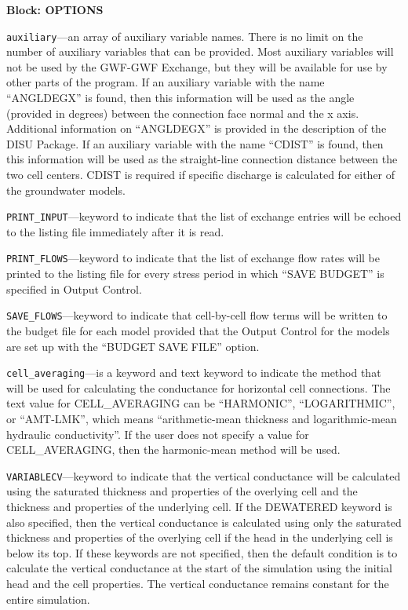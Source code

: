 
\item \textbf{Block: OPTIONS}

\begin{description}
\item \texttt{auxiliary}---an array of auxiliary variable names.  There is no limit on the number of auxiliary variables that can be provided. Most auxiliary variables will not be used by the GWF-GWF Exchange, but they will be available for use by other parts of the program.  If an auxiliary variable with the name ``ANGLDEGX'' is found, then this information will be used as the angle (provided in degrees) between the connection face normal and the x axis.  Additional information on ``ANGLDEGX'' is provided in the description of the DISU Package.  If an auxiliary variable with the name ``CDIST'' is found, then this information will be used as the straight-line connection distance between the two cell centers.  CDIST is required if specific discharge is calculated for either of the groundwater models.

\item \texttt{PRINT\_INPUT}---keyword to indicate that the list of exchange entries will be echoed to the listing file immediately after it is read.

\item \texttt{PRINT\_FLOWS}---keyword to indicate that the list of exchange flow rates will be printed to the listing file for every stress period in which ``SAVE BUDGET'' is specified in Output Control.

\item \texttt{SAVE\_FLOWS}---keyword to indicate that cell-by-cell flow terms will be written to the budget file for each model provided that the Output Control for the models are set up with the ``BUDGET SAVE FILE'' option.

\item \texttt{cell\_averaging}---is a keyword and text keyword to indicate the method that will be used for calculating the conductance for horizontal cell connections.  The text value for CELL\_AVERAGING can be ``HARMONIC'', ``LOGARITHMIC'', or ``AMT-LMK'', which means ``arithmetic-mean thickness and logarithmic-mean hydraulic conductivity''. If the user does not specify a value for CELL\_AVERAGING, then the harmonic-mean method will be used.

\item \texttt{VARIABLECV}---keyword to indicate that the vertical conductance will be calculated using the saturated thickness and properties of the overlying cell and the thickness and properties of the underlying cell.  If the DEWATERED keyword is also specified, then the vertical conductance is calculated using only the saturated thickness and properties of the overlying cell if the head in the underlying cell is below its top.  If these keywords are not specified, then the default condition is to calculate the vertical conductance at the start of the simulation using the initial head and the cell properties.  The vertical conductance remains constant for the entire simulation.


\end{description}
